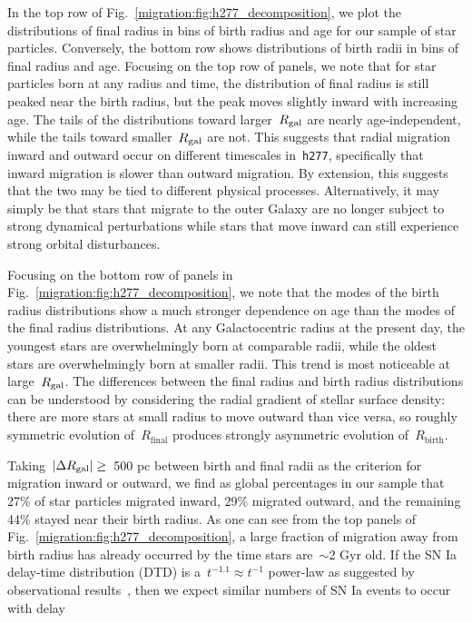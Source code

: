 In the top row of Fig.~\ref{migration:fig:h277_decomposition}, we plot the distributions 
of final radius in bins of birth radius and age for our sample of star 
particles. 
Conversely, the bottom row shows distributions of birth radii in bins of final 
radius and age. 
Focusing on the top row of panels, we note that for star particles born at any 
radius and time, the distribution of final radius is still peaked near the 
birth radius, but the peak moves slightly inward with increasing age. 
The tails of the distributions toward larger~$R_\text{gal}$ are nearly 
age-independent, while the tails toward smaller~$R_\text{gal}$ are not. 
This suggests that radial migration inward and outward occur on different 
timescales in~\texttt{h277}, specifically that inward migration is slower than 
outward migration. 
By extension, this suggests that the two may be tied to different physical 
processes. 
Alternatively, it may simply be that stars that migrate to the outer Galaxy are 
no longer subject to strong dynamical perturbations while stars that move 
inward can still experience strong orbital disturbances. 
\par 
Focusing on the bottom row of panels in Fig.~\ref{migration:fig:h277_decomposition}, we 
note that the modes of the birth radius distributions show a much stronger 
dependence on age than the modes of the final radius distributions. 
At any Galactocentric radius at the present day, the youngest stars are 
overwhelmingly born at comparable radii, while the oldest stars are 
overwhelmingly born at smaller radii. 
This trend is most noticeable at large~$R_\text{gal}$. 
The differences between the final radius and birth radius distributions can be 
understood by considering the radial gradient of stellar surface density: there 
are more stars at small radius to move outward than vice versa, so roughly 
symmetric evolution of~$R_\text{final}$ produces strongly asymmetric evolution 
of~$R_\text{birth}$. 
\par 
Taking~$\left|\Delta R_\text{gal}\right| \geq$~500 pc 
between birth and final radii as the criterion for migration inward or outward, 
we find as global percentages in our sample that 27\% of star particles 
migrated inward, 29\% migrated outward, and the remaining 44\% stayed near 
their birth radius. 
As one can see from the top panels of Fig.~\ref{migration:fig:h277_decomposition}, a 
large fraction of migration away from birth radius has already occurred by the 
time stars are~$\sim$2 Gyr old. 
If the SN Ia delay-time distribution (DTD) is a~$t^{-1.1} \approx t^{-1}$ 
power-law as suggested by observational results~\citep[e.g.][]{Maoz2012a, 
Maoz2017}, then we expect similar numbers of SN Ia events to occur with delay 
